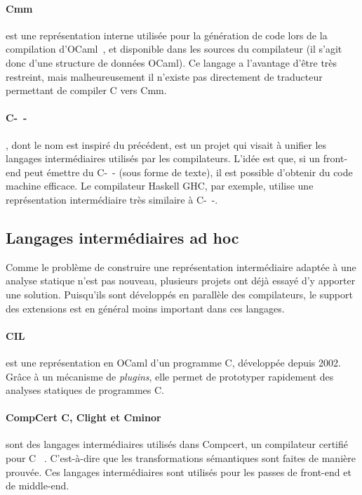 \paragraph{Cmm} est une représentation interne utilisée pour la génération de
code lors de la compilation d'OCaml~, et disponible dans les sources
du compilateur (il s'agit donc d'une structure de données OCaml). Ce langage a
l'avantage d'être très restreint, mais malheureusement il n'existe pas
directement de traducteur permettant de compiler C vers Cmm.

\paragraph{C-~-}\cite{spjcmm} , dont le nom est inspiré du précédent,
est un projet qui visait à unifier les langages intermédiaires utilisés par les
compilateurs. L'idée est que, si un front-end peut émettre du C-~- (sous forme de
texte), il est possible d'obtenir du code machine efficace. Le compilateur
Haskell GHC, par exemple, utilise une représentation intermédiaire très
similaire à C-~-.

\subsection*{Langages intermédiaires ad hoc}

Comme le problème de construire une représentation intermédiaire adaptée à une
analyse statique n'est pas nouveau, plusieurs projets ont déjà essayé d'y
apporter une solution. Puisqu'ils sont développés en parallèle des compilateurs,
le support des extensions est en général moins important dans ces langages.

\paragraph{CIL}\cite{NeculaCil} est une représentation en OCaml d'un programme
C, développée depuis 2002. Grâce à un mécanisme de \emph{plugins}, elle permet de
prototyper rapidement des analyses statiques de programmes C.

\paragraph{CompCert C, Clight et Cminor} sont des langages intermédiaires
utilisés dans Compcert, un compilateur certifié pour C
~\cite{cfront,cminorSLfull}. C'est-à-dire que les transformations sémantiques
sont faites de manière prouvée. Ces langages intermédiaires sont utilisés pour
les passes de front-end et de middle-end.

